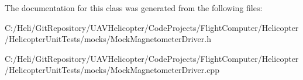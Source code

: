 The documentation for this class was generated from the following files\-:\begin{DoxyCompactItemize}
\item 
C\-:/\-Heli/\-Git\-Repository/\-U\-A\-V\-Helicopter/\-Code\-Projects/\-Flight\-Computer/\-Helicopter/\-Helicopter\-Unit\-Tests/mocks/Mock\-Magnetometer\-Driver.\-h\item 
C\-:/\-Heli/\-Git\-Repository/\-U\-A\-V\-Helicopter/\-Code\-Projects/\-Flight\-Computer/\-Helicopter/\-Helicopter\-Unit\-Tests/mocks/Mock\-Magnetometer\-Driver.\-cpp\end{DoxyCompactItemize}
